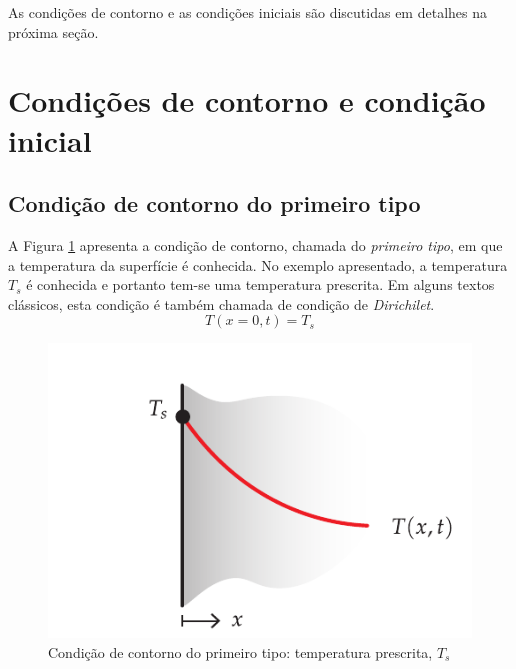 As condições de contorno e as condições iniciais são discutidas em detalhes na próxima seção.

\section{Condições de contorno e condição inicial}	

\subsection{Condição de contorno do primeiro tipo}
A Figura \ref{fig:ccTemperaturaPrescrita} apresenta a condição de contorno, chamada do \textit{primeiro tipo}, em que a temperatura da superfície é conhecida. No exemplo apresentado, a temperatura $T_s$ é conhecida e portanto tem-se uma temperatura prescrita. Em alguns textos clássicos, esta condição é também chamada de condição de \textit{Dirichilet}.
\begin{equation}\label{eq:q01}
	T(x=0,t) = T_s 
\end{equation}

\begin{figure}[H]
	\centering
	\includegraphics[scale=1]{figuras/cap1/ccTemperaturaConstante}
	\caption{Condição de contorno do primeiro tipo: temperatura prescrita, $T_s$}
	\label{fig:ccTemperaturaPrescrita}
\end{figure}

